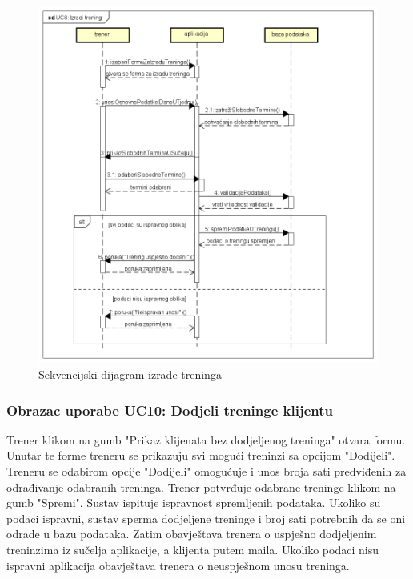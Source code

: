                 \begin{figure}[H]
		              \includegraphics[scale=0.5]{./Dijagrami/UC8_Izradi_trening.png}
		              \centering
		              \caption{Sekvencijski dijagram izrade treninga}
		              \label{fig:promjene}
	            \end{figure}

                \subsubsection{Obrazac uporabe UC10: Dodjeli treninge klijentu}
				\noindent Trener klikom na gumb "Prikaz klijenata bez dodjeljenog treninga" otvara formu. Unutar te forme treneru se prikazuju svi mogući treninzi sa opcijom "Dodijeli". Treneru se odabirom opcije "Dodijeli" omogućuje i unos broja sati predviđenih za odrađivanje odabranih treninga. Trener potvrđuje odabrane treninge klikom na gumb "Spremi". Sustav ispituje ispravnost spremljenih podataka. Ukoliko su podaci ispravni, sustav sperma dodjeljene treninge i broj sati potrebnih da se oni odrade u bazu podataka. Zatim obavještava trenera o uspješno dodjeljenim treninzima iz sučelja aplikacije, a klijenta putem maila. Ukoliko podaci nisu ispravni aplikacija obavještava trenera o neuspješnom unosu treninga. 


